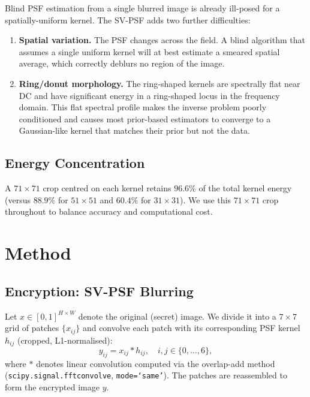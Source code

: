 \documentclass[11pt, a4paper]{article}
\begin{document}
Blind PSF estimation from a single blurred image is already ill-posed for
a spatially-uniform kernel.  The SV-PSF adds two further difficulties:

\begin{enumerate}
  \item \textbf{Spatial variation.}  The PSF changes across the field.  A
        blind algorithm that assumes a single uniform kernel will at best
        estimate a smeared spatial average, which correctly deblurs no
        region of the image.

  \item \textbf{Ring/donut morphology.}  The ring-shaped kernels are
        spectrally flat near DC and have significant energy in a ring-shaped
        locus in the frequency domain.  This flat spectral profile makes the
        inverse problem poorly conditioned and causes most prior-based
        estimators to converge to a Gaussian-like kernel that matches their
        prior but not the data.
\end{enumerate}

\subsection{Energy Concentration}

A $71\times 71$ crop centred on each kernel retains $96.6\%$ of the total
kernel energy (versus $88.9\%$ for $51\times 51$ and $60.4\%$ for
$31\times 31$).  We use this $71\times 71$ crop throughout to balance
accuracy and computational cost.

\section{Method}
\label{sec:method}

\subsection{Encryption: SV-PSF Blurring}
\label{ssec:blur}

Let $x \in [0,1]^{H\times W}$ denote the original (secret) image.  We divide
it into a $7\times 7$ grid of patches $\{x_{ij}\}$ and convolve each patch
with its corresponding PSF kernel $h_{ij}$ (cropped, L1-normalised):
\begin{equation}
  y_{ij} = x_{ij} \ast h_{ij}, \quad i,j \in \{0,\dots,6\},
  \label{eq:blur}
\end{equation}
where $\ast$ denotes linear convolution computed via the overlap-add method
(\texttt{scipy.signal.fftconvolve}, \texttt{mode=`same'}).  The patches are
reassembled to form the encrypted image $y$.
\end{document}
